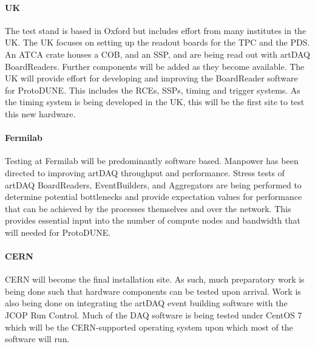 \paragraph{UK}
The test stand is based in Oxford but includes effort from many institutes 
in the UK.  The UK focuses on setting up the readout boards for the TPC and the 
PDS.  An ATCA crate houses a COB, and an SSP, and are being read out with
artDAQ BoardReaders.  Further components will be added as they become available.
The UK will provide effort for developing and improving
the BoardReader software for ProtoDUNE.  This includes the RCEs, SSPs, timing and
trigger systems.  As the timing system is being developed in the UK, this 
will be the first site to test this new hardware.
\paragraph{Fermilab}
Testing at Fermilab will be predominantly software based.  Manpower has been
directed to improving artDAQ throughput and performance.  Stress tests of artDAQ
BoardReaders, EventBuilders, and Aggregators are being performed to determine
potential bottlenecks and provide expectation values for performance that can be
achieved by the processes themselves and over the network.  This provides essential
input into the number of compute nodes and bandwidth that will needed for ProtoDUNE.
\paragraph{CERN}
CERN will become the final installation site.  As such, much preparatory work
is being done such that hardware components can be tested upon arrival.  Work is
also being done on integrating the artDAQ event building software with the JCOP
Run Control.  Much of the DAQ software is being tested under CentOS 7 which 
will be the CERN-supported operating system upon which most of the software will run.


